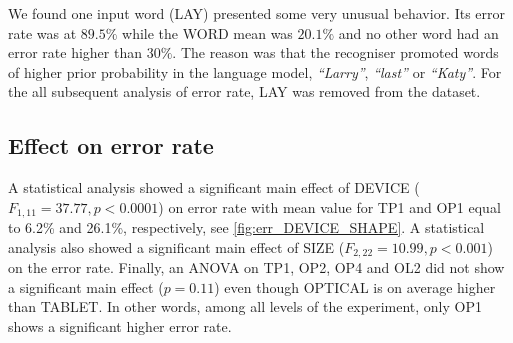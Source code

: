 \documentclass{chi-ext}
\newcommand{\cdt}[1]{{\small\uppercase{{#1}}}}
\begin{document}
We found one input word (\cdt{lay}) presented some very unusual behavior. Its error rate was at $89.5\%$ while the \cdt{WORD} mean was $20.1\%$ and no other word had an error rate higher than $30\%$. The reason was that the recogniser promoted words of higher prior probability in the language model, \textit{``Larry''}, \textit{``last''} or \textit{``Katy''}. For the all subsequent analysis of error rate, \cdt{lay} was removed from the dataset.

\subsection{Effect on error rate}
A statistical analysis showed a significant main effect of DEVICE ($F_{1,11} = 37.77, p < 0.0001$) on error rate with mean value for \cdt{TP1} and \cdt{OP1} equal to 6.2\% and 26.1\%, respectively, see \autoref{fig:err_DEVICE_SHAPE}. A statistical analysis also showed a significant main effect of \cdt{SIZE} ($F_{2,22} = 10.99, p < 0.001$) on the error rate. Finally, an ANOVA on \cdt{TP1}, \cdt{OP2}, \cdt{OP4} and \cdt{OL2} did not show a significant main effect ($p = 0.11$) even though \cdt{OPTICAL} is on average higher than \cdt{TABLET}. In other words, among all levels of the experiment, only \cdt{OP1} shows a significant higher error rate.
\end{document}
